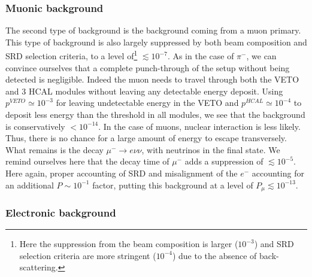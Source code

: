 \subsubsection{Muonic background}
\label{ch3:sec:bkg:inv:muon}

The second type of background is the background coming from a muon primary. This type of background is also largely suppressed by both beam composition and SRD selection criteria, to a level of\footnote{Here the suppression from the beam composition is larger ($10^{-3}$) \cite{h4-beamline} and SRD selection criteria are more stringent ($10^{-4}$) due to the absence of back-scattering.} $\lesssim 10^{-7}$. As in the case of $\pi^-$, we can convince ourselves that a complete punch-through of the setup without being detected is negligible. Indeed the muon needs to travel through both the VETO and 3 HCAL modules without leaving any detectable energy deposit. Using $p^{VETO} \simeq 10^{-3}$ for leaving undetectable energy in the VETO and $p^{HCAL} \simeq 10^{-4}$ to deposit less energy than the threshold in all modules, we see that the background is conservatively $< 10^{-14}$. In the case of muons, nuclear interaction is less likely. Thus, there is no chance for a large amount of energy to escape transversely. What remains is the decay $\mu^- \rightarrow e\nu\nu$, with neutrinos in the final state. We remind ourselves here that the decay time of $\mu^-$ adds a suppression of $\lesssim 10^{-5}$. Here again, proper accounting of SRD and misalignment of the $e^-$ accounting for an additional $P\sim 10^{-1}$ factor, putting this background at a level of $P_{\mu} \lesssim 10^{-13}$.

\subsubsection{Electronic background}
\label{ch3:sec:bkg:inv:elec}

